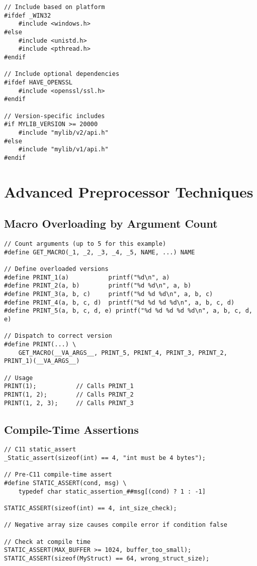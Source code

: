 \begin{lstlisting}
// Include based on platform
#ifdef _WIN32
    #include <windows.h>
#else
    #include <unistd.h>
    #include <pthread.h>
#endif

// Include optional dependencies
#ifdef HAVE_OPENSSL
    #include <openssl/ssl.h>
#endif

// Version-specific includes
#if MYLIB_VERSION >= 20000
    #include "mylib/v2/api.h"
#else
    #include "mylib/v1/api.h"
#endif
\end{lstlisting}

\section{Advanced Preprocessor Techniques}

\subsection{Macro Overloading by Argument Count}

\begin{lstlisting}
// Count arguments (up to 5 for this example)
#define GET_MACRO(_1, _2, _3, _4, _5, NAME, ...) NAME

// Define overloaded versions
#define PRINT_1(a)           printf("%d\n", a)
#define PRINT_2(a, b)        printf("%d %d\n", a, b)
#define PRINT_3(a, b, c)     printf("%d %d %d\n", a, b, c)
#define PRINT_4(a, b, c, d)  printf("%d %d %d %d\n", a, b, c, d)
#define PRINT_5(a, b, c, d, e) printf("%d %d %d %d %d\n", a, b, c, d, e)

// Dispatch to correct version
#define PRINT(...) \
    GET_MACRO(__VA_ARGS__, PRINT_5, PRINT_4, PRINT_3, PRINT_2, PRINT_1)(__VA_ARGS__)

// Usage
PRINT(1);           // Calls PRINT_1
PRINT(1, 2);        // Calls PRINT_2
PRINT(1, 2, 3);     // Calls PRINT_3
\end{lstlisting}

\subsection{Compile-Time Assertions}

\begin{lstlisting}
// C11 static_assert
_Static_assert(sizeof(int) == 4, "int must be 4 bytes");

// Pre-C11 compile-time assert
#define STATIC_ASSERT(cond, msg) \
    typedef char static_assertion_##msg[(cond) ? 1 : -1]

STATIC_ASSERT(sizeof(int) == 4, int_size_check);

// Negative array size causes compile error if condition false

// Check at compile time
STATIC_ASSERT(MAX_BUFFER >= 1024, buffer_too_small);
STATIC_ASSERT(sizeof(MyStruct) == 64, wrong_struct_size);
\end{lstlisting}

